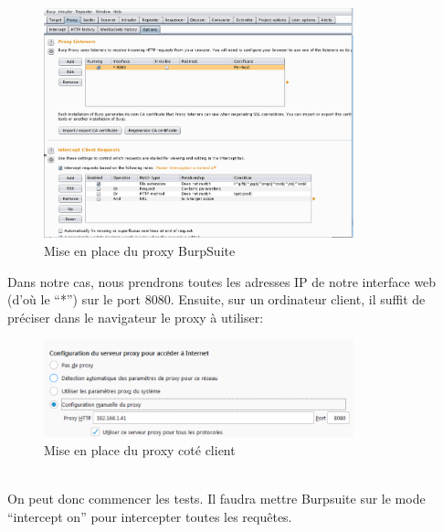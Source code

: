 \begin{figure}[htp!]
  \centering
  \setlength\figureheight{7cm}
  \setlength\figurewidth{9cm}
  \includegraphics[width=0.8\textwidth]{oui/Ancien/imangeancien/burpsuite/burpsuite2.PNG}
  \caption{Mise en place du proxy BurpSuite}
  \label{fig:courbe-tikz}
\end{figure}
Dans notre cas, nous prendrons toutes les adresses IP de notre interface web (d’où le “*”) sur le port 8080. Ensuite, sur un ordinateur client, il suffit de préciser dans le navigateur le proxy à utiliser:
\begin{figure}[htp!]
  \centering
  \setlength\figureheight{7cm}
  \setlength\figurewidth{9cm}
  \includegraphics[width=0.8\textwidth]{oui/Ancien/imangeancien/burpsuite/burpsuite3.PNG}
  \caption{Mise en place du proxy coté client}
  \label{fig:courbe-tikz}
\end{figure}\\
On peut donc commencer les tests. Il faudra mettre Burpsuite sur le mode “intercept on” pour intercepter toutes les requêtes.\\

